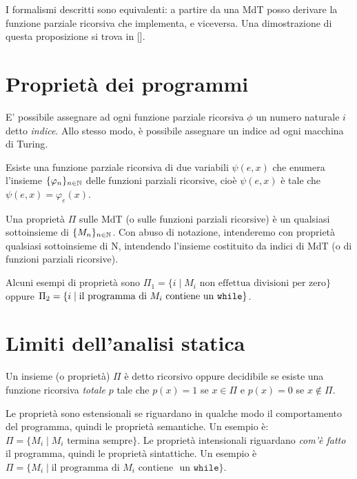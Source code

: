 I formalismi descritti sono equivalenti: a partire da una MdT posso derivare la funzione parziale ricorsiva che implementa, e viceversa. Una dimostrazione di questa proposizione si trova in [\cite[p.~15]{soare87}].

\section{Proprietà dei programmi}

E' possibile assegnare ad ogni funzione parziale ricorsiva $\phi$ un numero naturale $i$ detto \emph{indice}. Allo stesso modo, è possibile assegnare un indice ad ogni macchina di Turing. 

\begin{theorem}
Esiste una funzione parziale ricorsiva di due variabili $\psi(e,x)$ che enumera l'insieme $\{ \varphi_n \}_{n \in \mathbb{N}}$ delle funzioni parziali ricorsive, cioè $\psi(e,x)$ è tale che $\psi(e,x) = \varphi_e(x)$.
\end{theorem}

\begin{definition}
Una proprietà $\Pi$ sulle MdT (o sulle funzioni parziali ricorsive) è un qualsiasi sottoinsieme di $\{ M_n \}_{n \in \mathbb{N}}$. Con abuso di notazione, intenderemo con proprietà qualsiasi sottoinsieme di N, intendendo l’insieme costituito da indici di MdT (o di funzioni parziali ricorsive).
\end{definition}

Alcuni esempi di proprietà sono $\Pi_1 = \{ i \mid M_i \text{ non effettua divisioni per zero} \}$ oppure $\Pi_2 = \{ i \mid \text{il programma di } M_i \text{ contiene un \texttt{while}} \}$.

\section{Limiti dell'analisi statica}

\begin{definition}
Un insieme (o proprietà) $\Pi$ è detto ricorsivo oppure decidibile se esiste una funzione ricorsiva \emph{totale} $p$ tale che $p(x) = 1$ se $x \in \Pi$ e $p(x) = 0$ se $x \not\in \Pi$.
\end{definition}

Le proprietà sono estensionali se riguardano in qualche modo il comportamento del programma, quindi le proprietà semantiche. Un esempio è: $\Pi = \{ M_i \mid M_i \text{ termina sempre} \}$. Le proprietà intensionali riguardano \emph{com'è fatto} il programma, quindi le proprietà sintattiche. Un esempio è $\Pi = \{ M_i \mid \text{il programma di } M_i \text{ contiene }$ $\text{un } \texttt{while} \}$.

